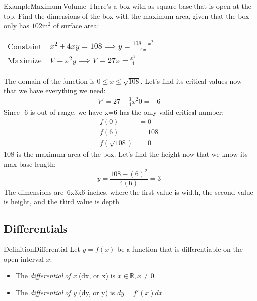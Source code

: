 \documentclass{MathNotes}
\newenvironment{example}[1]{\begin{BlueBox}{Example}{#1}}{\end{BlueBox}}
\newenvironment{definition}[1]{\begin{RedBox}{Definition}{#1}}{\end{RedBox}}
\begin{document}
\begin{example}{Maximum Volume}\label{ex:max-volume}
	There's a box with as square base that is open at the top. Find the dimensions of the box with the maximum area, given that the box only has $102\text{in}^2$ of surface area:\newline
	\begin{center}
		\begin{tabular}{ll}
			Constaint & $x^2+4xy=108\implies y=\frac{108-x^2}{4x}$ \\
			Maximize  & $V=x^2y\implies V=27x-\frac{x^3}{4}$
		\end{tabular}
	\end{center}
	The domain of the function is $0\leq x\leq\sqrt{108}$. Let's find its critical
	values now that we have everything we need:
	\begin{align*}
		V'=27-\frac{3}{4}x^2
		0=\pm 6
	\end{align*}
	Since -6 is out of range, we have x=6 has the only valid critical number:
	\begin{align*}
		f(0)          & =0   \\
		f(6)          & =108 \\
		f(\sqrt{108}) & =0
	\end{align*}
	108 is the maximum area of the box. Let's find the height now that we know its
	max base length: $$y=\frac{108-(6)^2}{4(6)}=3$$
	The dimensions are: 6x3x6 inches, where the first value is width, the second value is height, and the third value is depth
\end{example}


\subsection{Differentials}\label{sec:differentials}
\begin{definition}{Differential}\label{def:differential}
	Let $y=f(x)$ be a function that is differentiable on the open interval $x$:
	\begin{itemize}
		\item The \textit{differential of x} (dx, or \Delta x) is $x\in\mathbb{R}, x\neq 0$
		\item The \textit{differential of y} (dy, or \Delta y) is $dy=f'(x)dx$
	\end{itemize}
\end{definition}
\end{document}

